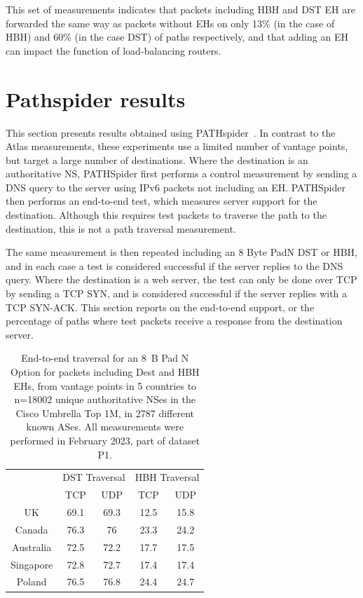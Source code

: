 \documentclass[conference]{IEEEtran}
\begin{document}
This set of measurements indicates that packets including HBH and DST EH are forwarded the same way as packets without EHs on only 13\% (in the case of HBH) and 60\% (in the case DST) of paths respectively, and that adding an EH can impact the function of load-balancing routers.
 
\section{Pathspider results} 
\label{sec:pathspider-results}

This section presents results obtained using PATHspider~\cite{learmonth2016pathspider}. In contrast to the Atlas measurements, these experiments use a limited number of vantage points, but target a large number of destinations. Where the destination is an authoritative NS, PATHSpider first performs a control measurement by sending a DNS query to the server using IPv6 packets not including an EH.
PATHSpider then performs an end-to-end test, which measures server support for the destination. Although this requires test packets to traverse the path to the destination, this is not a path traversal measurement.

The same measurement is then repeated including an 8 Byte PadN DST or HBH, and in each case a test is considered successful if the server replies to the DNS query. Where the destination is a web server, the test can only be done over TCP by sending a TCP SYN, and is considered successful if the server replies with a TCP SYN-ACK.
This section reports on the end-to-end support, or the percentage of paths where test packets receive a response from the destination server.

\begin{table} 
\begin{tabular}{c|cc|cc}
\multicolumn{1}{l|}{} & \multicolumn{2}{c|}{DST Traversal} & \multicolumn{2}{c}{HBH Traversal} \\ \cline{2-5} 
\multicolumn{1}{l|}{} & \multicolumn{1}{c|}{TCP}       & UDP      & \multicolumn{1}{c|}{TCP}     & UDP     \\ \hline
UK                    & \multicolumn{1}{c|}{69.1}      & 69.3    & \multicolumn{1}{c|}{12.5}    & 15.8  \\ \hline
Canada                & \multicolumn{1}{c|}{76.3}      & 76     & \multicolumn{1}{c|}{23.3}    & 24.2  \\ \hline
Australia             & \multicolumn{1}{c|}{72.5}        & 72.2      & \multicolumn{1}{c|}{17.7}    & 17.5  \\ \hline
Singapore             & \multicolumn{1}{c|}{72.8}      & 72.7    & \multicolumn{1}{c|}{17.4}    & 17.4   \\ \hline
Poland                & \multicolumn{1}{c|}{76.5}      & 76.8   & \multicolumn{1}{c|}{24.4}    & 24.7   
\end{tabular}
\label{tbl:e2e_traversal}
\caption{End-to-end traversal for an 8~B Pad N Option for packets including Dest and HBH EHs, from vantage points in 5 countries to n=18002 unique authoritative NSes in the Cisco Umbrella Top 1M, in 2787 different known ASes. All measurements were performed in February 2023, part of dataset P1. }
\end{table}
\end{document}
